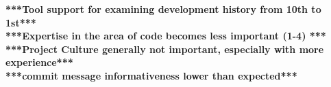 \textbf{***Tool support for examining development history from 10th to 1st***}\\
\textbf{***Expertise in the area of code becomes less important (1-4) ***}\\
\textbf{***Project Culture generally not important, especially with more experience***}\\
\textbf{***commit message informativeness lower than expected***}\\

